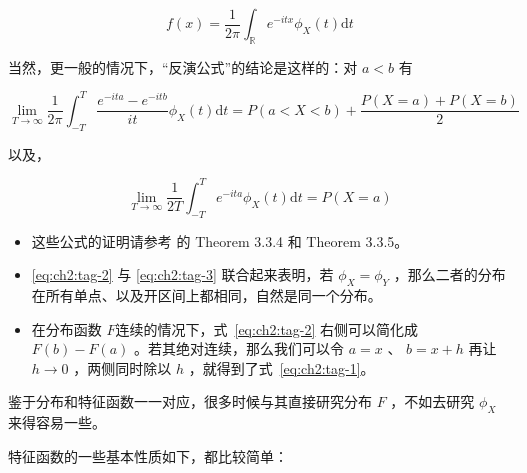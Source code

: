 \begin{equation}
\label{eq:ch2:tag-1}
f(x)=\frac1{2\pi}\int_{\mathbb R}e^{-itx}\phi_X(t)\mathrm dt
\end{equation}

当然，更一般的情况下，``反演公式''的结论是这样的：对 $a<b$ 有

\begin{equation}
\label{eq:ch2:tag-2}
\lim_{T\to\infty}\frac1{2\pi}\int_{-T}^T\frac{e^{-ita}-e^{-itb}}{it}\phi_X(t)\mathrm{d}t=P(a<X<b)+\frac{P(X=a)+P(X=b)}2
\end{equation}

以及，

\begin{equation}
\label{eq:ch2:tag-3}
\lim_{T\to\infty}\frac1{2T}\int_{-T}^Te^{-ita}\phi_X(t)\mathrm{d}t=P(X=a)
\end{equation}

\begin{remark}

\begin{itemize}
\tightlist
\item
  这些公式的证明请参考 \cite{durrett2010} 的 Theorem 3.3.4 和 Theorem 3.3.5。
\item
  \eqref{eq:ch2:tag-2} 与 \eqref{eq:ch2:tag-3} 联合起来表明，若 $\phi_X=\phi_Y$ ，那么二者的分布在所有单点、以及开区间上都相同，自然是同一个分布。
\item
  在分布函数 $F$连续的情况下，式~\eqref{eq:ch2:tag-2} 右侧可以简化成 $F(b)-F(a)$ 。若其绝对连续，那么我们可以令 $a=x$ 、 $b=x+h$ 再让 $h\to 0$ ，两侧同时除以 $h$ ，就得到了式~\eqref{eq:ch2:tag-1}。
\end{itemize}
\end{remark}

鉴于分布和特征函数一一对应，很多时候与其直接研究分布 $F$ ，不如去研究 $\phi_X$ 来得容易一些。

特征函数的一些基本性质如下，都比较简单：

